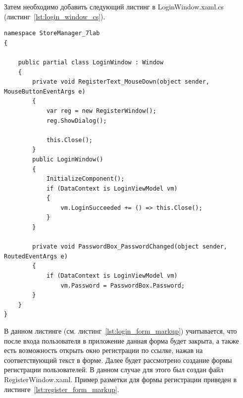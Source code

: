 \documentclass[12pt]{article}
\newcommand{\colorGIT}[1]{\textcolor{CtpLavender}{#1}}
\renewcommand{\texttt}[1]{{\small\ttfamily #1}}
\newenvironment{code}
  {\par\captionsetup{type=listing}\noindent}
  {\par\vspace{\baselineskip}}
\numberwithin{listing}{section}
\numberwithin{figure}{section}
\begin{document}
\noindent Затем необходимо добавить следующий листинг в \texttt{LoginWindow.xaml.cs} (листинг~\ref{lst:login_window_cs}).
\begin{code}
	\begin{verbatim}
namespace StoreManager_7lab
{

    public partial class LoginWindow : Window
    {
        private void RegisterText_MouseDown(object sender, MouseButtonEventArgs e)
        {
            var reg = new RegisterWindow();
            reg.ShowDialog();
             
            this.Close();
        }
        public LoginWindow()
        {
            InitializeComponent();
            if (DataContext is LoginViewModel vm)
            {
                vm.LoginSucceeded += () => this.Close();
            }
        }   

        private void PasswordBox_PasswordChanged(object sender, RoutedEventArgs e)
        {
            if (DataContext is LoginViewModel vm)
                vm.Password = PasswordBox.Password;
        }
    }
}
\end{verbatim}
	\caption{\colorGIT{\href{https://github.com/WebMasterIT/Csharp_Labs/blob/main/7_lab_WPF/StoreManager_7lab/StoreManager_7lab/RegisterWindow.xaml.cs}{\texttt{LoginWindow.xaml.cs}}}}
	\label{lst:login_window_cs}
\end{code}

В данном листинге (см. листинг~\ref{lst:login_form_markup}) учитывается, что после входа пользователя в приложение данная форма будет закрыта, а также есть возможность открыть окно регистрации по ссылке, нажав на соответствующий текст в форме.
Далее будет рассмотрено создание формы регистрации пользователей. В данном случае для этого был создан файл \texttt{RegisterWindow.xaml}.
Пример разметки для формы регистрации приведен в листинге~\ref{lst:register_form_markup}.
\end{document}
